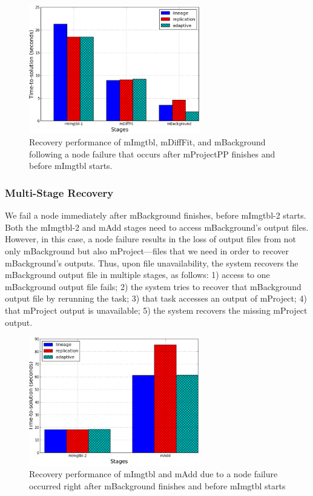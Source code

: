 \documentclass{sig-alternate}
\begin{document}
\begin{figure}[ht]
        \begin{center}
                \includegraphics[width=75mm]{pictures/kill-mProjectPP}
                \vspace{-10pt}
                \caption{Recovery performance of mImgtbl, mDiffFit, and mBackground following a node failure that occurs after mProjectPP finishes and before mImgtbl starts.
                \label{fig:montage-fail-mProjectPP}}
        \end{center}
\end{figure}

\subsubsection{Multi-Stage Recovery}
We fail a node immediately after mBackground finishes, before mImgtbl-2 starts.
Both the mImgtbl-2 and mAdd stages need to access mBackground's output files.
However, in this case, a node failure results in the loss of output files from not only mBackground but also mProject---files
that we need in order to recover mBackground's outputs.
Thus, upon file unavailability, the system recovers the mBackground output file in multiple stages, as follows:
1) access to one mBackground output file fails;
2) the system tries to recover that mBackground output file by rerunning the task;
3) that task accesses an output of mProject;
4) that mProject output is unavailable;
5) the system recovers the missing mProject output.

\begin{figure}[h]
        \begin{center}
                \includegraphics[width=75mm]{pictures/kill-mBack}
                \vspace{-10pt}
                \caption{Recovery performance of mImgtbl and mAdd due to a node failure occurred right after mBackground finishes and before mImgtbl starts
                \label{fig:montage-fail-mBackground}}
        \end{center}
\end{figure}
\end{document}
